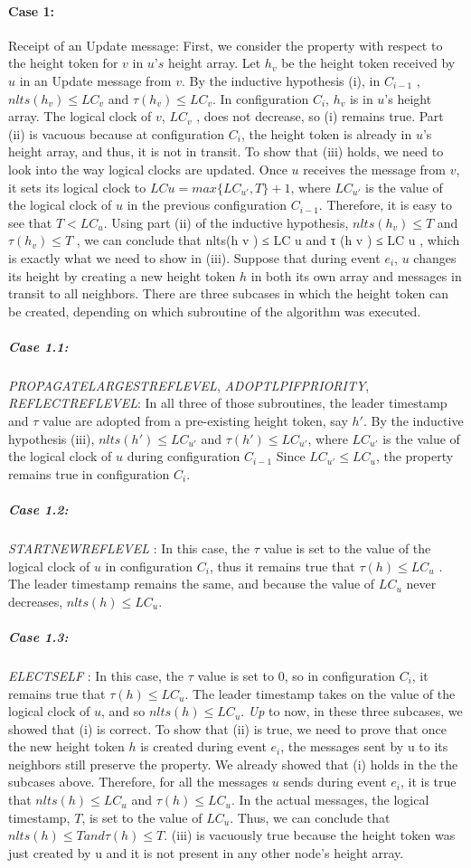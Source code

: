 \documentclass{article}
\begin{document}
\paragraph{Case 1:}
Receipt of an Update message: First, we consider the property with respect to the height token for $v$ in $u’s$ height array. Let $h_v$ be the height token received by $u$ in an Update message from $v$. By the inductive hypothesis (i), in $C_{i − 1}$ , $nlts(h_v) \leq LC_v$ and $\tau (h_v) \leq LC_v$. In configuration $C_i$, $h_v$ is in $u$’s height array. The logical clock of $v$, $LC_v$ , does not decrease, so (i) remains true. Part (ii) is vacuous because at configuration $C_i$, the height token is already in $u$’s height array, and thus, it is not in transit. To show that (iii) holds, we need to look into the way logical clocks are updated. Once $u$ receives the message from $v$, it sets its logical clock to $LC u = max\lbrace LC_{u'}, T\rbrace + 1$, where $LC_{u'}$ is the value of the logical clock of $u$ in the previous configuration $C_{i − 1}$.
Therefore, it is easy to see that $T < LC_u$. Using part (ii) of the inductive hypothesis, $nlts(h_v) \leq T$ and $τ (h_v) \leq T$ , we can conclude that nlts(h v ) ≤ LC u and τ (h v ) ≤ LC u , which is exactly what we need to show in (iii).
Suppose that during event $e_i$, $u$ changes its height by creating a new height token $h$ in both its own array and messages in transit to all neighbors. There are three subcases in which the height token can be created, depending on which subroutine of the algorithm was executed.
\subparagraph{Case 1.1:}
\textit{PROPAGATELARGESTREFLEVEL}, \textit{ADOPTLPIFPRIORITY}, \textit{REFLECTREFLEVEL}:
In all three of those subroutines, the leader timestamp and $\tau $ value are adopted from a pre-existing height token, say $h'$. By the inductive hypothesis (iii), $nlts(h') \leq LC_{u'}$ and $\tau (h') \leq LC_{u'}$, where $LC_{u'}$ is the value of the logical clock of $u$ during configuration $C_{i − 1}$ Since $LC_{u'} \leq LC_u$, the property remains true in configuration $C_i$.
\subparagraph{Case 1.2:}
\textit{STARTNEWREFLEVEL} : In this case, the $\tau$ value is set to the value of the logical clock of $u$ in configuration $C_i$, thus it remains true that $\tau (h) \leq LC_u$ . The leader timestamp remains the same, and because the value of $LC_u$ never decreases, $nlts(h) ≤ LC_u$.
\subparagraph{Case 1.3:}
\textit{ELECTSELF} : In this case, the $\tau $ value is set to 0, so in configuration $C_i$, it remains true that $\tau (h) ≤ LC_u$.
The leader timestamp takes on the value of the logical clock of $u$, and so $nlts(h) \leq LC_u$.
\textit{Up} to now, in these three subcases, we showed that (i) is correct. To show that (ii) is true, we need to prove that once the new height token $h$ is created during event $e_i$, the messages sent by u to its neighbors still preserve the property. We already showed that (i) holds in the the subcases above. Therefore, for all the messages $u$ sends during event $e_i$, it is true that $nlts(h) \leq LC_u$ and $\tau (h) \leq LC_u$. In the actual messages, the logical timestamp, $T$, is set to the value of $LC_u$. Thus, we can conclude that $nlts(h) \leq T and \tau (h) \leq T$. (iii) is vacuously true because the height token was just created by u and it is not present in any other node’s height array.
\end{document}

